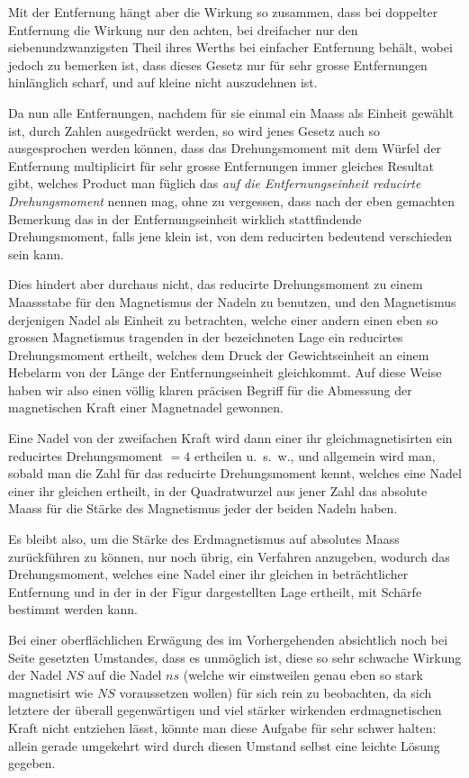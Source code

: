 \documentclass[12pt,a4paper]{article}
\begin{document}
Mit der Entfernung hängt aber die Wirkung so zusammen, dass bei doppelter Entfernung die Wirkung nur den achten, bei dreifacher nur den siebenundzwanzigsten Theil ihres Werths bei einfacher Entfernung behält, wobei jedoch zu bemerken ist, dass dieses Gesetz nur für sehr grosse Entfernungen hinlänglich scharf, und auf kleine nicht auszudehnen ist.

Da nun alle Entfernungen, nachdem für sie einmal ein Maass als Einheit gewählt ist, durch Zahlen ausgedrückt werden, so wird jenes Gesetz auch so ausgesprochen werden können, dass das Drehungsmoment mit dem Würfel der Entfernung multiplicirt für sehr grosse Entfernungen immer gleiches Resultat gibt, welches Product man füglich das \textit{auf die Entfernungseinheit reducirte Drehungsmoment} nennen mag, ohne zu vergessen, dass nach der eben gemachten Bemerkung das in der Entfernungseinheit wirklich stattfindende Drehungsmoment, falls jene klein ist, von dem reducirten bedeutend verschieden sein kann.

Dies hindert aber durchaus nicht, das reducirte Drehungsmoment zu einem Maassstabe für den Magnetismus der Nadeln zu benutzen, und den Magnetismus derjenigen Nadel als Einheit zu betrachten, welche einer andern einen eben so grossen Magnetismus tragenden in der bezeichneten Lage ein reducirtes Drehungsmoment ertheilt, welches dem Druck der Gewichtseinheit an einem Hebelarm von der Länge der Entfernungseinheit gleichkommt. Auf diese Weise haben wir also einen völlig klaren präcisen Begriff für die Abmessung der magnetischen Kraft einer Magnetnadel gewonnen.

Eine Nadel von der zweifachen Kraft wird dann einer ihr gleichmagnetisirten ein reducirtes Drehungsmoment $= 4$ ertheilen u.~s.~w., und allgemein wird man, sobald man die Zahl für das reducirte Drehungsmoment kennt, welches eine Nadel einer ihr gleichen ertheilt, in der Quadratwurzel aus jener Zahl das absolute Maass für die Stärke des Magnetismus jeder der beiden Nadeln haben.

\bigskip

Es bleibt also, um die Stärke des Erdmagnetismus auf absolutes Maass zurückführen zu können, nur noch übrig, ein Verfahren anzugeben, wodurch das Drehungsmoment, welches eine Nadel einer ihr gleichen in beträchtlicher Entfernung und in der in der Figur dargestellten Lage ertheilt, mit Schärfe bestimmt werden kann.

Bei einer oberflächlichen Erwägung des im Vorhergehenden absichtlich noch bei Seite gesetzten Umstandes, dass es unmöglich ist, diese so sehr schwache Wirkung der Nadel $NS$ auf die Nadel $ns$ (welche wir einstweilen genau eben so stark magnetisirt wie $NS$ voraussetzen wollen) für sich rein zu beobachten, da sich letztere der überall gegenwärtigen und viel stärker wirkenden erdmagnetischen Kraft nicht entziehen lässt, könnte man diese Aufgabe für sehr schwer halten: allein gerade umgekehrt wird durch diesen Umstand selbst eine leichte Lösung gegeben.
\end{document}
